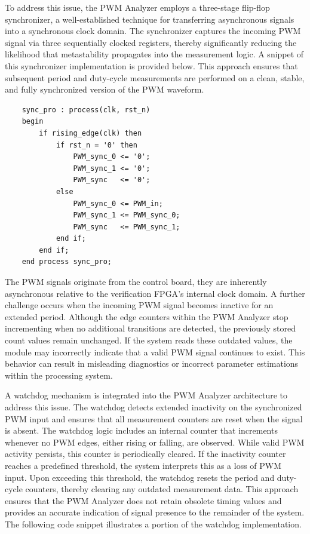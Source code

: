 To address this issue, the \acs{PWM} Analyzer employs a three-stage flip-flop synchronizer, a well-established technique for transferring asynchronous signals into a synchronous clock domain. The synchronizer captures the incoming \acs{PWM} signal via three sequentially clocked registers, thereby significantly reducing the likelihood that metastability propagates into the measurement logic. A snippet of this synchronizer implementation is provided below. This approach ensures that subsequent period and duty-cycle measurements are performed on a clean, stable, and fully synchronized version of the \acs{PWM} waveform.

\begin{lstlisting}
	sync_pro : process(clk, rst_n)
	begin
		if rising_edge(clk) then
			if rst_n = '0' then
				PWM_sync_0 <= '0';
				PWM_sync_1 <= '0';
				PWM_sync   <= '0';
			else
				PWM_sync_0 <= PWM_in;
				PWM_sync_1 <= PWM_sync_0;
				PWM_sync   <= PWM_sync_1;
			end if;
		end if;
	end process sync_pro;
\end{lstlisting}

The \acs{PWM} signals originate from the control board, they are inherently asynchronous relative to the verification \acs{FPGA}’s internal clock domain. A further challenge occurs when the incoming \acs{PWM} signal becomes inactive for an extended period. Although the edge counters within the \acs{PWM} Analyzer stop incrementing when no additional transitions are detected, the previously stored count values remain unchanged. If the system reads these outdated values, the module may incorrectly indicate that a valid \acs{PWM} signal continues to exist. This behavior can result in misleading diagnostics or incorrect parameter estimations within the processing system.

A watchdog mechanism is integrated into the \acs{PWM} Analyzer architecture to address this issue. The watchdog detects extended inactivity on the synchronized \acs{PWM} input and ensures that all measurement counters are reset when the signal is absent. The watchdog logic includes an internal counter that increments whenever no \acs{PWM} edges, either rising or falling, are observed. While valid \acs{PWM} activity persists, this counter is periodically cleared. If the inactivity counter reaches a predefined threshold, the system interprets this as a loss of \acs{PWM} input. Upon exceeding this threshold, the watchdog resets the period and duty-cycle counters, thereby clearing any outdated measurement data. This approach ensures that the \acs{PWM} Analyzer does not retain obsolete timing values and provides an accurate indication of signal presence to the remainder of the system. The following code snippet illustrates a portion of the watchdog implementation.

